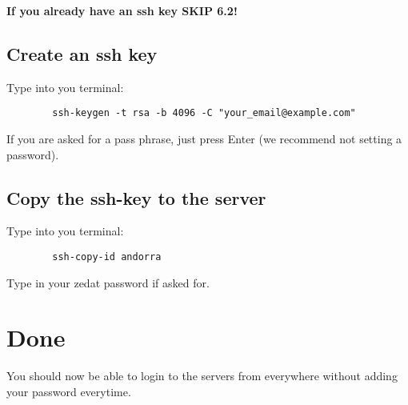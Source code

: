 \documentclass{article}
\begin{document}
	\textbf{If you already have an ssh key SKIP 6.2!}
	
	\subsection{Create an ssh key}
	
	Type into you terminal:
	
	\begin{verbatim}
		ssh-keygen -t rsa -b 4096 -C "your_email@example.com"
	\end{verbatim}
	
	If you are asked for a pass phrase, just press Enter (we recommend not setting a password).
	
	\subsection{Copy the ssh-key to the server}
	
	Type into you terminal:
	
	\begin{verbatim}
		ssh-copy-id andorra
	\end{verbatim}

	Type in your zedat password if asked for.
	
	\section{Done}
	
	You should now be able to login to the servers from everywhere without adding your password everytime.
\end{document}
